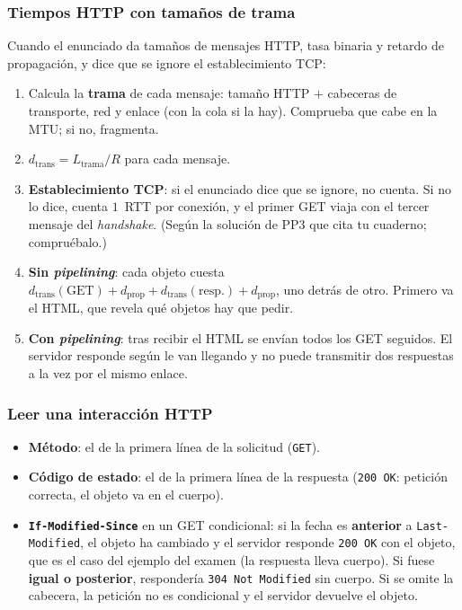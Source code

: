 \documentclass[11pt,a4paper]{article}
\begin{document}
\subsubsection{Tiempos HTTP con tamaños de trama}

Cuando el enunciado da tamaños de mensajes HTTP, tasa binaria y retardo de propagación, y dice que se ignore el establecimiento TCP:

\begin{enumerate}[leftmargin=1.6em]
  \item Calcula la \textbf{trama} de cada mensaje: tamaño HTTP $+$ cabeceras de transporte, red y enlace (con la cola si la hay). Comprueba que cabe en la MTU; si no, fragmenta.
  \item $d_{\text{trans}}=L_{\text{trama}}/R$ para cada mensaje.
  \item \textbf{Establecimiento TCP}: si el enunciado dice que se ignore, no cuenta. Si no lo dice, cuenta $1$~RTT por conexión, y el primer GET viaja con el tercer mensaje del \emph{handshake}. (Según la solución de PP3 que cita tu cuaderno; compruébalo.)
  \item \textbf{Sin \emph{pipelining}}: cada objeto cuesta $d_{\text{trans}}(\text{GET})+d_{\text{prop}}+d_{\text{trans}}(\text{resp.})+d_{\text{prop}}$, uno detrás de otro. Primero va el HTML, que revela qué objetos hay que pedir.
  \item \textbf{Con \emph{pipelining}}: tras recibir el HTML se envían todos los GET seguidos. El servidor responde según le van llegando y no puede transmitir dos respuestas a la vez por el mismo enlace.
\end{enumerate}

\subsubsection{Leer una interacción HTTP}

\begin{itemize}
  \item \textbf{Método}: el de la primera línea de la solicitud (\texttt{GET}).
  \item \textbf{Código de estado}: el de la primera línea de la respuesta (\texttt{200 OK}: petición correcta, el objeto va en el cuerpo).
  \item \textbf{\texttt{If-Modified-Since}} en un GET condicional: si la fecha es \textbf{anterior} a \texttt{Last-Modified}, el objeto ha cambiado y el servidor responde \texttt{200 OK} con el objeto, que es el caso del ejemplo del examen (la respuesta lleva cuerpo). Si fuese \textbf{igual o posterior}, respondería \texttt{304 Not Modified} sin cuerpo. Si se omite la cabecera, la petición no es condicional y el servidor devuelve el objeto.
\end{itemize}
\end{document}
